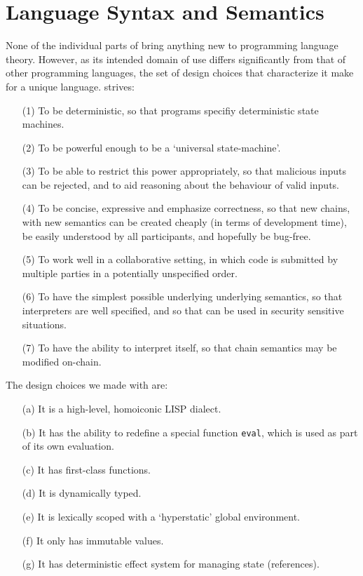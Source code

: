 \section{Language Syntax and Semantics}
\label{s:language}

None of the individual parts of \rad{} bring anything
new to programming language theory. However, as its intended domain of use
differs significantly from that of other programming languages, the set of
design choices that characterize it make for a unique language. \rad{} strives:
\begin{itemize}
\item[(1)] To be deterministic, so that \rad{} programs specifiy deterministic
  state machines.
\item[(2)] To be powerful enough to be a `universal state-machine'.
\item[(3)] To be able to restrict this power appropriately, so that malicious
  inputs can be rejected, and to aid reasoning about the behaviour of valid
  inputs.
\item[(4)] To be concise, expressive and emphasize correctness, so that new
  chains, with new semantics can be created cheaply (in terms of development
  time), be easily understood by all participants, and hopefully be bug-free.
\item[(5)] To work well in a collaborative setting, in which code is submitted
  by multiple parties in a potentially unspecified order.
\item[(6)] To have the simplest possible underlying underlying semantics, so
  that \rad{} interpreters are well specified, and so that \rad{} can be used in
  security sensitive situations.
\item[(7)] To have the ability to interpret itself, so that chain semantics may
  be modified on-chain.
\end{itemize}

The design choices we made with \rad{} are:
\begin{itemize}
\item[(a)] It is a high-level, homoiconic LISP dialect.
\item[(b)] It has the ability to redefine a special function \texttt{eval}, which
  is used as part of its own evaluation.
\item[(c)] It has first-class functions.
\item[(d)] It is dynamically typed.
\item[(e)] It is lexically scoped with a `hyperstatic' global environment.
\item[(f)] It only has immutable values.
\item[(g)] It has deterministic effect system for managing state (references).
\end{itemize}

